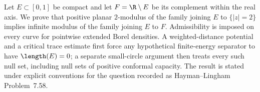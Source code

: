 
Let $E\subset[0,1]$ be compact and let $F=\R\setminus E$ be its complement
within the real axis. We prove that positive planar $2$-modulus of the family
joining $E$ to $\{|z|=2\}$ implies infinite modulus of the family joining $E$
to $F$. Admissibility is imposed on every curve for pointwise extended Borel
densities. A weighted-distance potential and a critical trace estimate first
force any hypothetical finite-energy separator to have $\length(E)=0$; a
separate small-circle argument then treats every such null set, including
null sets of positive conformal capacity. The result is stated under explicit
conventions for the question recorded as Hayman--Lingham Problem~7.58.
